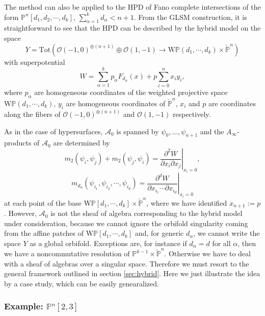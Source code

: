 \documentclass[a4paper,11pt]{article}
\def\cA{\mathcal{A}}
\newcommand{\Af}{{A_\infty}}
\newcommand{\bP}{{\mathbb{P}}}
\numberwithin{equation}{section}
\begin{document}
The method can also be applied to the HPD of Fano complete 
intersections of the form $\bP^n[d_1,d_2,\cdots,d_k]$, $\sum_{\alpha=1}^{k}d_{\alpha}<n+1$. 
From the GLSM construction, it is straightforward to see that the HPD can be described by the hybrid model on the space
\begin{equation}\label{compTot}
Y=\mathrm{Tot}\left( \mathcal{O}(-1,0)^{\oplus(n+1)} \oplus \mathcal{O}(1,-1) 
\rightarrow \mathrm{W}\mathbb{P}(d_1,\cdots,d_k) \times \check{\mathbb{P}}^n 
\right)
\end{equation}
with superpotential
\begin{equation}\label{compSp}
W = \sum _{\alpha=1}^k p_{\alpha} F_{d_{\alpha}}(x) +  p\sum_{i=0}^n x_i y_i,
\end{equation}
where $p_{\alpha}$ are homogeneous coordinates of the weighted projective space 
$\mathrm{W}\mathbb{P}(d_1,\cdots,d_k)$, $y_i$ are homogeneous coordinates of 
$\check{\mathbb{P}}^n$, $x_i$ and $p$ are coordinates along the fibers of 
$\mathcal{O}(-1,0)^{\oplus(n+1)}$ and $\mathcal{O}(1,-1)$ respectively.

As in the case of hypersurfaces, $\mathcal{A}_0$ is spanned by 
$\psi_{0},\ldots, \psi_{n+1}$ and the $\Af$-products of $\cA_0$ 
are determined by
\[
m_2(\psi_i,\psi_j) + m_2(\psi_j,\psi_i) = \left.\frac{\partial^2 W}{\partial 
x_i \partial x_j}\right|_{x_i=0},
\]
\[
m_{d_{\alpha}}(\psi_{i_1},\psi_{i_2},\cdots,\psi_{i_d}) = \left. 
\frac{\partial^d W}{\partial x_{i_1} \cdots \partial x_{i_d}} \right|_{x_i=0}
\]
at each point of the base $\mathrm{W}\mathbb{P}[d_1,\cdots,d_k] \times 
\check{\mathbb{P}}^n$, where we have identified $x_{n+1}:=p$. However, 
$\mathcal{A}_0$ is not the sheaf of algebra corresponding to the hybrid model 
under consideration, because we cannot ignore the orbifold singularity coming 
from the affine patches 
of $\mathrm{W}\mathbb{P}[d_1,\cdots,d_k]$ and, for generic $d_{\alpha}$, we 
cannot write the space $Y$ as a global orbifold. Exceptions are, for instance 
if $d_{\alpha}=d$ for all $\alpha$, then we have a noncommutative resolution of 
$\mathbb{P}^{k-1}\times\check{\mathbb{P}}^n$. Otherwise we have to deal with a 
sheaf of algebras over a singular space. Therefore we must resort to the general 
framework outlined in section \ref{sec:hybrid}. Here we just illustrate the idea 
by a case study, which can be easily genearalized.


\subsubsection*{Example: $\mathbb{P}^n[2,3]$}
\end{document}
